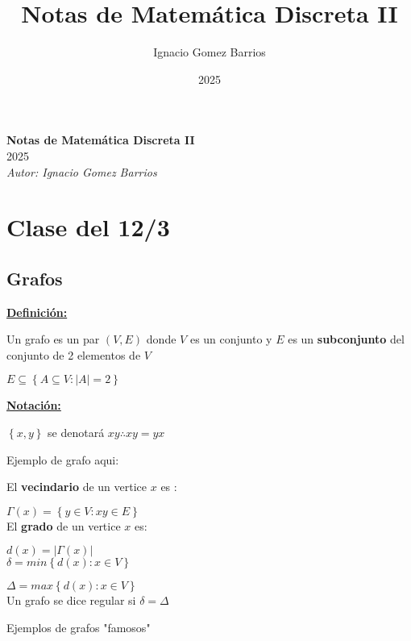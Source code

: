 \documentclass[12pt]{article}
\title{Notas de Matemática Discreta II}
\date{2025}
\author{Ignacio Gomez Barrios}
\begin{document}
\newpage

\begin{center}
  \Huge \textbf{Notas de Matemática Discreta II} \\[3cm]
  \Large 2025 \\[4cm]
  \Large \textit{Autor: Ignacio Gomez Barrios}
\end{center}

\newpage

\section*{Clase del 12/3}
\subsection*{Grafos}
\underline{\textbf{Definición:}} 

Un grafo es un par \((V, E)\) donde \(V\) es un conjunto y \(E\) es un \textbf{subconjunto} del conjunto de 2 elementos de \(V\)

\(E \subseteq \left\{A \subseteq V : |A| = 2\right\}\) \bigskip

\underline{\textbf{Notación:}}

\(\left\{x, y\right\}\) se denotará \(xy \therefore xy = yx\)

Ejemplo de grafo aqui: \bigskip

 El \textbf{vecindario} de un vertice \(x\) es :

\(\Gamma(x) = \left\{y \in V : xy \in E\right\}\) \\

El \textbf{grado} de un vertice \(x\) es:

\(d(x) = |\Gamma(x)|\) \\

\(\delta = min\left\{d(x) : x \in V\right\}\)

\(\Delta = max\left\{d(x) : x \in V\right\}\) \\

Un grafo se dice regular si \(\delta = \Delta\) \bigskip

Ejemplos de grafos "famosos"
\end{document}
